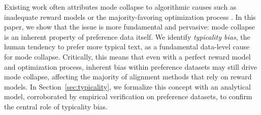 


Existing work often attributes mode collapse to algorithmic causes such as inadequate reward models \citep{chakraborty2024maxmin} or the majority-favoring optimization process \citep{xiao2024algorithmic}. {In this paper, we show that the issue is more fundamental and pervasive: mode collapse is an inherent property of preference data itself}.  We identify \emph{typicality bias}, the human tendency to prefer more typical text, as a fundamental data-level cause for mode collapse. Critically, this means that even with a perfect reward model and optimization process, inherent bias within preference datasets may still drive mode collapse, affecting the majority of alignment methods that rely on reward models. In Section~\ref{sec:typicality}, we formalize this concept with an analytical model, corroborated by empirical verification on preference datasets, to confirm the central role of typicality bias.





